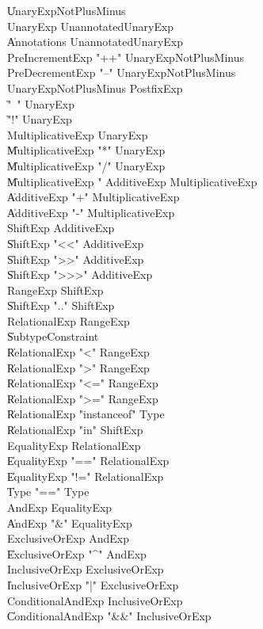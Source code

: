 {\begin{grammar}
    \| UnaryExpNotPlusMinus\\
 UnaryExp  \: UnannotatedUnaryExp\\
    \| Annotations UnannotatedUnaryExp\\
 PreIncrementExp  \: \xcd"++" UnaryExpNotPlusMinus\\
 PreDecrementExp  \: \xcd"--" UnaryExpNotPlusMinus\\
 UnaryExpNotPlusMinus  \: PostfixExp\\
    \| \xcd"~" UnaryExp\\
    \| \xcd"!" UnaryExp\\
 MultiplicativeExp  \: UnaryExp\\
    \| MultiplicativeExp \xcd"*" UnaryExp\\
    \| MultiplicativeExp \xcd"/" UnaryExp\\
    \| MultiplicativeExp \xcd"%
 AdditiveExp  \: MultiplicativeExp\\
    \| AdditiveExp \xcd"+" MultiplicativeExp\\
    \| AdditiveExp \xcd"-" MultiplicativeExp\\
 ShiftExp  \: AdditiveExp\\
    \| ShiftExp \xcd"<<" AdditiveExp\\
    \| ShiftExp \xcd">>" AdditiveExp\\
    \| ShiftExp \xcd">>>" AdditiveExp\\
 RangeExp  \: ShiftExp\\
    \| ShiftExp  \xcd".." ShiftExp \\
 RelationalExp  \: RangeExp\\
    \| SubtypeConstraint\\
    \| RelationalExp \xcd"<" RangeExp\\
    \| RelationalExp \xcd">" RangeExp\\
    \| RelationalExp \xcd"<=" RangeExp\\
    \| RelationalExp \xcd">=" RangeExp\\
    \| RelationalExp \xcd"instanceof" Type\\
    \| RelationalExp \xcd"in" ShiftExp\\
 EqualityExp  \: RelationalExp\\
    \| EqualityExp \xcd"==" RelationalExp\\
    \| EqualityExp \xcd"!=" RelationalExp\\
    \| Type  \xcd"==" Type \\
 AndExp  \: EqualityExp\\
    \| AndExp \xcd"&" EqualityExp\\
 ExclusiveOrExp  \: AndExp\\
    \| ExclusiveOrExp \xcd"^" AndExp\\
 InclusiveOrExp  \: ExclusiveOrExp\\
    \| InclusiveOrExp \xcd"|" ExclusiveOrExp\\
 ConditionalAndExp  \: InclusiveOrExp\\
    \| ConditionalAndExp \xcd"&&" InclusiveOrExp\\
\end{grammar}

}
